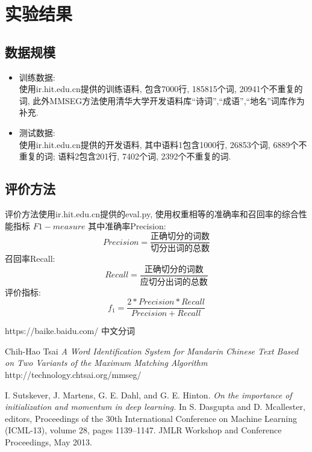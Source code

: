 \documentclass[titlepage]{article}
\begin{document}
\section{实验结果}
\subsection{数据规模}
\begin{itemize}
    \item 训练数据:\\[1em]
        使用ir.hit.edu.cn提供的训练语料, 包含7000行, 185815个词, 20941个不重复的词, 此外MMSEG方法使用清华大学开发语料库``诗词'',``成语'',``地名''词库作为补充.\\
    \item 测试数据:\\[1em]
        使用ir.hit.edu.cn提供的开发语料, 其中语料1包含1000行, 26853个词, 6889个不重复的词; 语料2包含201行, 7402个词, 2392个不重复的词.
\end{itemize}
\subsection{评价方法}
评价方法使用ir.hit.edu.cn提供的eval.py, 使用权重相等的准确率和召回率的综合性能指标 $F1-measure$
其中准确率Precision:
$$
Precision = \frac{\texttt{正确切分的词数}}{\texttt{切分出词的总数}}
$$
召回率Recall:
$$
Recall = \frac{\texttt{正确切分的词数}}{\texttt{应切分出词的总数}}
$$
评价指标:
$$
f_1 = \frac{2 * Precision * Recall}{Precision + Recall}
$$
\begin{thebibliography}{1}

     https://baike.baidu.com/ 中文分词

     Chih-Hao Tsai \textit{A Word Identification System for Mandarin Chinese Text Based on Two Variants of the Maximum Matching Algorithm} http://technology.chtsai.org/mmseg/ 

     I. Sutskever, J. Martens, G. E. Dahl, and G. E. Hinton. \textit{On the importance of initialization and momentum in deep learning.} In S. Dasgupta and D. Mcallester, editors, Proceedings of the 30th International Conference on Machine Learning (ICML-13), volume 28, pages 1139–1147. JMLR Workshop and Conference Proceedings, May 2013.

\end{thebibliography}
\end{document}
